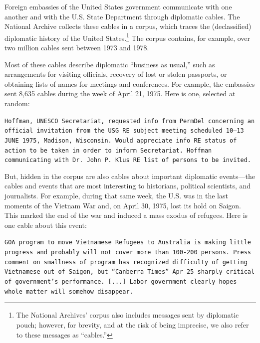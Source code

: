 
Foreign embassies of the United States government communicate with one
another and with the U.S. State Department through diplomatic cables.
The National Archive collects these cables in a corpus, which traces
the (declassified) diplomatic history of the United States.\footnote{
  The National Archives' corpus also includes messages sent by
  diplomatic pouch; however, for brevity, and at the risk of being
  imprecise, we also refer to these messages as
  ``cables.''}  The corpus contains, for example, over two million
cables sent between 1973 and 1978.

Most of these cables describe diplomatic ``business as usual,'' such
as arrangements for visiting officials, recovery of lost or stolen
passports, or obtaining lists of names for meetings and
conferences. For example, the embassies sent 8,635 cables during the
week of April 21, 1975. Here is one, selected at random:
\begin{shaded*} \tt{Hoffman, UNESCO Secretariat, requested info from
PermDel concerning an official invitation from the USG
RE subject meeting scheduled 10--13 JUNE 1975, Madison,
Wisconsin.  Would appreciate info RE status of action to
be taken in order to inform Secretariat.  Hoffman communicating
with Dr.~John P.~Klus RE list of persons to be invited.}
\end{shaded*}

But, hidden in the corpus are also cables about important diplomatic
events---the cables and events that are most interesting to
historians, political scientists, and journalists. For example, during
that same week, the U.S. was in the last moments of the Vietnam War
and, on April 30, 1975, lost its hold on Saigon. This marked the
end of the war and induced a mass exodus of refugees. Here is one cable
about this event:
\begin{shaded*}
  \tt{GOA program to move Vietnamese Refugees to Australia
  is making little progress and probably will not cover more than
  100-200 persons.  Press comment on smallness of program has
  recognized difficulty of getting Vietnamese out of Saigon, but
  ``Canberra Times'' Apr 25 sharply critical of government's
  performance.  [...]
  Labor government clearly hopes whole
  matter will somehow disappear.}
\end{shaded*}

